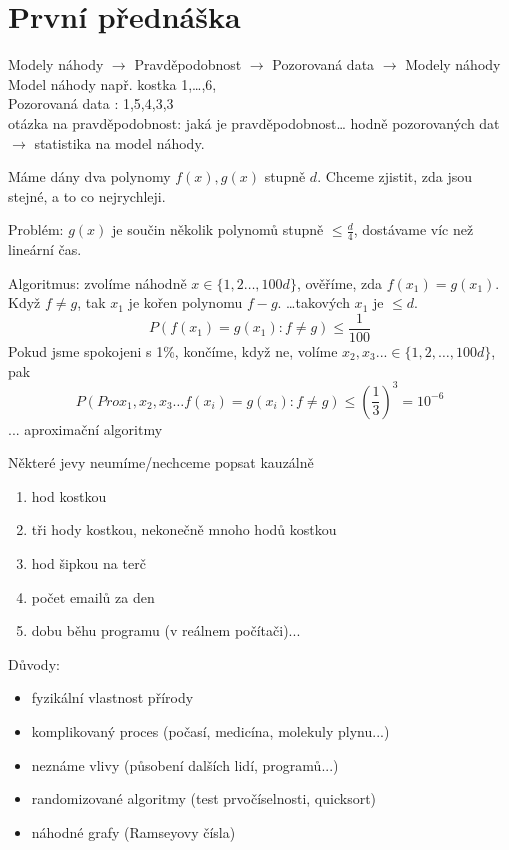 \documentclass[../main.tex]{subfiles}
\begin{document}
\section{První přednáška}

Modely náhody $\rightarrow$ Pravděpodobnost $\rightarrow$ Pozorovaná data 
$\rightarrow$ Modely náhody\\
Model náhody např. kostka 1,\dots,6,\\
Pozorovaná data : 1,5,4,3,3\\
otázka na pravděpodobnost: jaká je pravděpodobnost\dots
hodně pozorovaných dat $\rightarrow$ statistika na model náhody.

\begin{example}
    Máme dány dva polynomy $f(x),g(x)$ stupně $d$. Chceme zjistit, zda jsou stejné, 
    a to co nejrychleji.

    \noindent
    Problém: $g(x)$ je součin několik polynomů stupně $\leq \frac{d}{4}$, 
    dostávame víc než lineární čas.\\
\end{example}

\begin{solution}
    Algoritmus: zvolíme náhodně $x \in \{1,2\dots,100d\}$, ověříme, 
    zda $f(x_1) = g(x_1)$. Když $f \neq g$, tak $x_1$ je kořen polynomu $f-g$.
    \dots takových $x_1$ je  $\leq d$.\\
    \[P(f(x_1)=g(x_1) : f\neq g) \leq \frac{1}{100}\]
    Pokud jsme spokojeni s 1\%, končíme, když ne, volíme
    $x_2,x_3... \in \{1,2,\dots,100d\}$, pak 
    \[P(Pro x_1,x_2,x_3\dots  f(x_i)=g(x_i) : f\neq g) \leq 
    \left(\frac{1}{3}\right)^3 = 10^{-6}\]
    ... aproximační algoritmy
\end{solution}

\vspace{5mm}
\noindent 
Některé jevy neumíme/nechceme popsat kauzálně
\begin{enumerate}
    \item hod kostkou
    \item tři hody kostkou, nekonečně mnoho hodů kostkou
    \item hod šipkou na terč
    \item počet emailů za den
    \item dobu běhu programu (v reálnem počítači)...
\end{enumerate}
Důvody:
\begin{itemize}
    \item fyzikální vlastnost přírody
    \item komplikovaný proces (počasí, medicína, molekuly plynu...)
    \item neznáme vlivy (působení dalších lidí, programů...)
    \item randomizované algoritmy (test prvočíselnosti, quicksort)
    \item náhodné grafy (Ramseyovy čísla)
\end{itemize}
\end{document}
